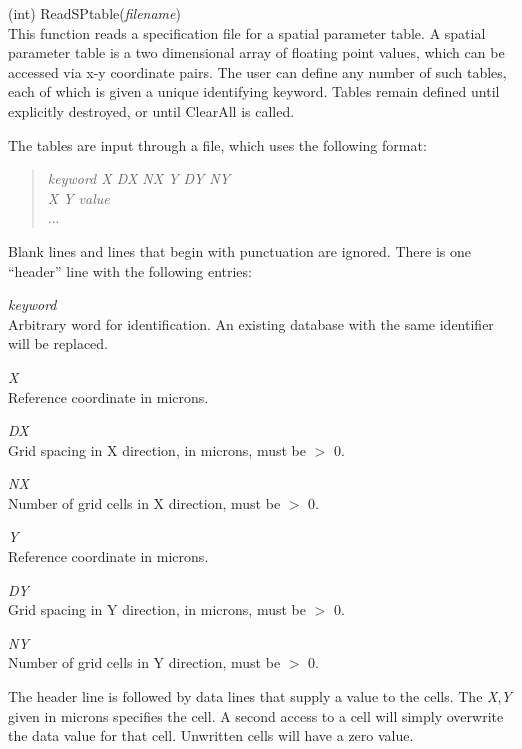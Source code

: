 \begin{description}
\item{(int) \vt ReadSPtable({\it filename\/})}\\
This function reads a specification file for a spatial parameter
table.  A spatial parameter table is a two dimensional array of
floating point values, which can be accessed via x-y coordinate pairs. 
The user can define any number of such tables, each of which is given
a unique identifying keyword.  Tables remain defined until explicitly
destroyed, or until {\vt ClearAll} is called.

The tables are input through a file, which uses the following format:

\begin{quote}
{\it keyword X DX NX Y DY NY}\\
{\it X Y value}\\
{\vt ...}
\end{quote}

Blank lines and lines that begin with punctuation are ignored.
There is one ``header'' line with the following entries:

\begin{description}
\item{\it keyword}\\
Arbitrary word for identification.  An existing database with the same
identifier will be replaced.
\item{\it X}\\
Reference coordinate in microns.
\item{\it DX}\\
Grid spacing in X direction, in microns, must be $>$ 0.
\item{\it NX}\\
Number of grid cells in X direction, must be $>$ 0.
\item{\it Y}\\
Reference coordinate in microns.
\item{\it DY}\\
Grid spacing in Y direction, in microns, must be $>$ 0.
\item{\it NY}\\
Number of grid cells in Y direction, must be $>$ 0.
\end{description}

The header line is followed by data lines that supply a value to the
cells.  The {\it X\/},{\it Y} given in microns specifies the cell.  A
second access to a cell will simply overwrite the data value for that
cell.  Unwritten cells will have a zero value.


\end{description}
